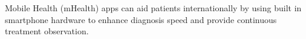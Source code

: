 Mobile Health (mHealth) apps can aid patients internationally by using built in smartphone hardware to enhance diagnosis speed and provide continuous treatment observation.